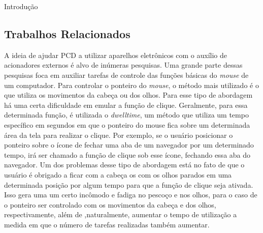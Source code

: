 \begin{chapter}{Introdução}
\subsection{Trabalhos Relacionados}
A ideia de ajudar PCD a utilizar aparelhos eletrônicos com o auxílio de 
acionadores externos é alvo de inúmeras pesquisas. Uma grande parte dessas
pesquisas foca em auxiliar tarefas de controle das funções básicas do
\textit{mouse} de um computador. Para controlar o ponteiro do \textit{mouse}, o
método mais utilizado é o que utiliza os movimentos da cabeça ou dos olhos. Para
esse tipo de abordagem há uma certa dificuldade em emular a função de clique.
Geralmente, para essa determinada função,  é utilizada o \textit{dwelltime}, 
um método que utiliza um tempo específico em segundos em que o ponteiro do mouse
fica sobre um determinada área da tela para realizar  o clique. Por exemplo, se
o usuário posicionar o ponteiro sobre o ícone de fechar uma aba de um navegador
por um determinado tempo, irá ser chamado a função de clique sob esse ícone,
fechando essa aba do navegador. Um dos problemas desse tipo de abordagem está no
fato de que o usuário é obrigado a ficar com a cabeça os com os olhos parados
em uma determinada posição por algum tempo para que a função de clique seja
ativada. Isso gera uma um certo incômodo e fadiga no pescoço e nos olhos, para o 
caso de o  ponteiro ser controlado com os movimentos da cabeça e dos olhos, 
respectivamente, além de ,naturalmente, aumentar o tempo de utilização a medida em
que o número de tarefas realizadas também aumentar.


\end{chapter}
